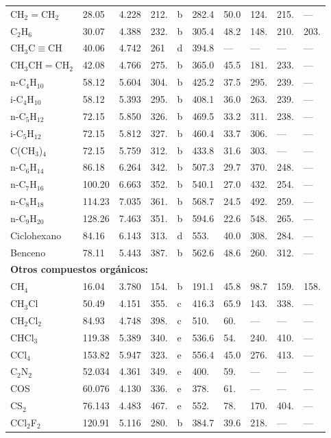 \begin{landscape}
\begin{longtable}{p{2.6cm}p{1.3cm}|p{1.5cm}p{1.5cm}p{0.5cm}|p{1.5cm}p{1.5cm}p{1.5cm}|p{2cm}p{1.8cm}}
$\mathrm{CH_2}=\mathrm{CH_2}$ & 28.05 & 4.228 & 212. & b & 282.4 & 50.0 & 124. & 215. & — \\
C$_2$H$_6$ & 30.07 & 4.388 & 232. & b & 305.4 & 48.2 & 148. & 210. & 203. \\
$\text{CH}_3\text{C} \equiv \text{CH}$& 40.06 & 4.742 & 261 & d & 394.8 & — & — & — & — \\
$\text{CH}_3\text{CH} = \text{CH}_2$& 42.08 & 4.766 & 275. & b & 365.0 & 45.5 & 181. & 233. & — \\
n-C$_4$H$_{10}$ & 58.12 & 5.604 & 304. & b & 425.2 & 37.5 & 295. & 239. & — \\
i-C$_4$H$_{10}$ & 58.12 & 5.393 & 295. & b & 408.1 & 36.0 & 263. & 239. & — \\
n-C$_5$H$_{12}$ & 72.15 & 5.850 & 326. & b & 469.5 & 33.2 & 311. & 238. & — \\
i-C$_5$H$_{12}$ & 72.15 & 5.812 & 327. & b & 460.4 & 33.7 & 306. & — & — \\
C(CH$_3$)$_4$ & 72.15 & 5.759 & 312. & b & 433.8 & 31.6 & 303. & — & — \\
n-C$_6$H$_{14}$ & 86.18 & 6.264 & 342. & b & 507.3 & 29.7 & 370. & 248. & — \\
n-C$_7$H$_{16}$ & 100.20 & 6.663 & 352. & b & 540.1 & 27.0 & 432. & 254. & — \\
n-C$_8$H$_{18}$ & 114.23 & 7.035 & 361. & b & 568.7 & 24.5 & 492. & 259. & — \\
n-C$_9$H$_{20}$ & 128.26 & 7.463 & 351. & b & 594.6 & 22.6 & 548. & 265. & — \\
Ciclohexano & 84.16 & 6.143 & 313. & d & 553. & 40.0 & 308. & 284. & — \\
Benceno & 78.11 & 5.443 & 387. & b & 562.6 & 48.6 & 260. & 312. & — \\
\midrule
\multicolumn{10}{l}{\textbf{Otros compuestos orgánicos:}} \\
CH$_4$ & 16.04 & 3.780 & 154. & b & 191.1 & 45.8 & 98.7 & 159. & 158. \\
CH$_3$Cl & 50.49 & 4.151 & 355. & c & 416.3 & 65.9 & 143. & 338. & — \\
CH$_2$Cl$_2$ & 84.93 & 4.748 & 398. & c & 510. & 60. & — & — & — \\
CHCl$_3$ & 119.38 & 5.389 & 340. & e & 536.6 & 54. & 240. & 410. & — \\
CCl$_4$ & 153.82 & 5.947 & 323. & e & 556.4 & 45.0 & 276. & 413. & — \\
C$_2$N$_2$ & 52.034 & 4.361 & 349. & e & 400. & 59. & — & — & — \\
COS & 60.076 & 4.130 & 336. & e & 378. & 61. & — & — & — \\
CS$_2$ & 76.143 & 4.483 & 467. & e & 552. & 78. & 170. & 404. & — \\
CCl$_2$F$_2$ & 120.91 & 5.116 & 280. & b & 384.7 & 39.6 & 218. & — & — \\
\bottomrule
\end{longtable}


\end{landscape}
